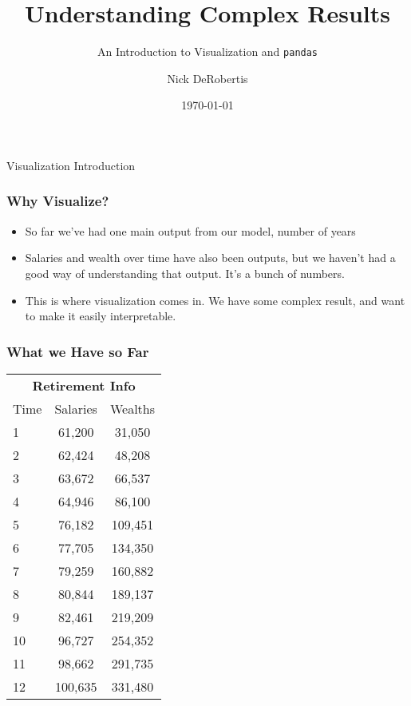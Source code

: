 \documentclass[handout, 11pt]{beamer}
\institute[UF]{\inst{1}
University of Florida\\
Department of Finance, Insurance, and Real Estate}
\begin{document}
\title[Visualization]{Understanding Complex Results}
\subtitle{An Introduction to Visualization and \texttt{pandas}}
\author[DeRobertis]{Nick DeRobertis}
\date{\today}
\begin{frame}
\titlepage
\label{title-frame}
\end{frame}
\begin{section}[Intro]{Visualization Introduction}
\begin{frame}
\frametitle{Why Visualize?}
\begin{itemize}
\item So far we've had one main output from our model, number of years
\vfill
\item Salaries and wealth over time have also been outputs, but we haven't had a good way of understanding that output. It's a bunch of numbers.
\vfill
\item This is where visualization comes in. We have some complex result, and want to make it easily interpretable.
\end{itemize}
\end{frame}
\begin{frame}
\frametitle{What we Have so Far}
\begin{center}
\begin{tabular}{lcc}
\multicolumn{3}{c}{\textbf{Retirement Info}}\\
\cmidrule(lr){1-3}
Time & Salaries & Wealths\\
  1 &   61,200 &   31,050 \\
  2 &   62,424 &   48,208 \\
  3 &   63,672 &   66,537 \\
  4 &   64,946 &   86,100 \\
  5 &   76,182 &  109,451 \\
  6 &   77,705 &  134,350 \\
  7 &   79,259 &  160,882 \\
  8 &   80,844 &  189,137 \\
  9 &   82,461 &  219,209 \\
 10 &   96,727 &  254,352 \\
 11 &   98,662 &  291,735 \\
 12 &  100,635 &  331,480 \\


\end{tabular}
\end{center}
\end{frame}
\end{section}
\end{document}
